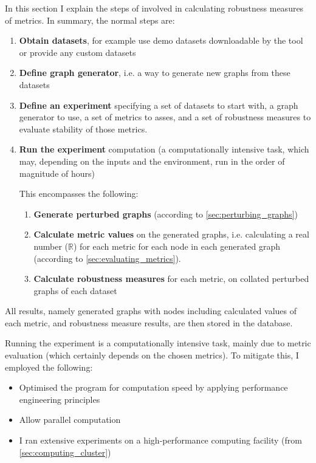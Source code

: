 In this section I explain the steps of \graffs involved in calculating robustness measures of metrics.
In summary, the normal steps are:
\begin{enumerate}
    \item \textbf{Obtain datasets}, for example use demo datasets downloadable by the \graffs tool or provide any custom datasets
    \item \textbf{Define graph generator}, i.e. a way to generate new graphs from these datasets
    \item \textbf{Define an experiment} specifying a set of datasets to start with, a graph generator to use, a set of metrics to asses, and a set of robustness measures to evaluate stability of those metrics.
    \item \textbf{Run the experiment} computation (a computationally intensive task, which may, depending on the inputs and the environment, run in the order of magnitude of hours)

    This encompasses the following:
    \begin{enumerate}[label=\alph*.]
        \item \textbf{Generate perturbed graphs} (according to \autoref{sec:perturbing_graphs})
        \item \textbf{Calculate metric values} on the generated graphs, i.e. calculating a real number ($\mathbb{R}$) for each metric for each node in each generated graph (according to \autoref{sec:evaluating_metrics}).
        \item \textbf{Calculate robustness measures} for each metric, on collated perturbed graphs of each dataset
    \end{enumerate}
\end{enumerate}

All results, namely generated graphs with nodes including calculated values of each metric, and robustness measure results, are then stored in the database.



Running the experiment is a computationally intensive task, mainly due to metric evaluation (which certainly depends on the chosen metrics).
To mitigate this, I employed the following:
\begin{itemize}[topsep=5pt]
    \item Optimised the program for computation speed by applying performance engineering principles
    \item Allow parallel computation
    \item I ran extensive experiments on a high-performance computing facility (from \autoref{sec:computing_cluster})
\end{itemize}

